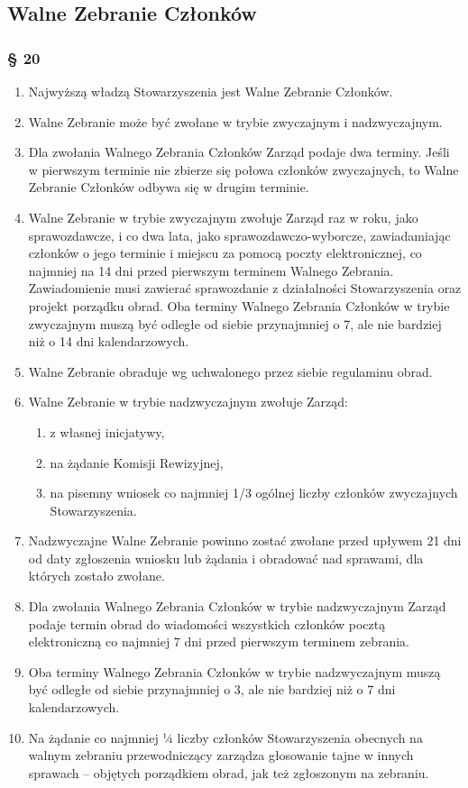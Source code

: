 \documentclass{article}
\newcommand{\myparagraph}[1]{\subsubsection*{#1}}
\begin{document}
\subsection*{Walne Zebranie Członków}
\myparagraph{§ 20}
\begin{enumerate}
\item
  Najwyższą władzą Stowarzyszenia jest Walne Zebranie Członków.
\item
  Walne Zebranie może być zwołane w trybie zwyczajnym i nadzwyczajnym.
\item
  Dla zwołania Walnego Zebrania Członków Zarząd podaje dwa terminy. Jeśli w pierwszym terminie nie zbierze się połowa członków zwyczajnych, to Walne Zebranie Członków odbywa się w drugim terminie.
\item
  Walne Zebranie w trybie zwyczajnym zwołuje Zarząd raz w roku, jako sprawozdawcze, i co dwa lata, jako sprawozdawczo-wyborcze, zawiadamiając członków o jego terminie i miejscu za pomocą poczty elektronicznej, co najmniej na 14 dni przed pierwszym terminem Walnego Zebrania. Zawiadomienie musi zawierać sprawozdanie z działalności Stowarzyszenia oraz projekt porządku obrad. Oba terminy Walnego Zebrania Członków w trybie zwyczajnym muszą być odległe od siebie przynajmniej o 7, ale nie bardziej niż o 14 dni kalendarzowych.
\item
  Walne Zebranie obraduje wg uchwalonego przez siebie regulaminu obrad.
\item
  Walne Zebranie w trybie nadzwyczajnym zwołuje Zarząd:
  \begin{enumerate}
  \def\labelenumii{\alph{enumii}.}
  \item
    z własnej inicjatywy,
  \item
    na żądanie Komisji Rewizyjnej,
  \item
    na pisemny wniosek co najmniej 1/3 ogólnej liczby członków zwyczajnych Stowarzyszenia.
  \end{enumerate}
\item
  Nadzwyczajne Walne Zebranie powinno zostać zwołane przed upływem 21 dni od daty zgłoszenia wniosku lub żądania i obradować nad sprawami, dla których zostało zwołane.
\item
  Dla zwołania Walnego Zebrania Członków w trybie nadzwyczajnym Zarząd podaje termin obrad do wiadomości wszystkich członków pocztą elektroniczną co najmniej 7 dni przed pierwszym terminem zebrania.
\item
  Oba terminy Walnego Zebrania Członków w trybie nadzwyczajnym muszą być odległe od siebie przynajmniej o 3, ale nie bardziej niż o 7 dni kalendarzowych.
\item
  Na żądanie co najmniej 1⁄4 liczby członków Stowarzyszenia obecnych na walnym zebraniu przewodniczący zarządza głosowanie tajne w innych sprawach -- objętych porządkiem obrad, jak też zgłoszonym na zebraniu.
\end{enumerate}
\end{document}
